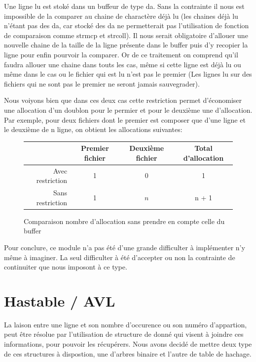 \documentclass[12pt]{article}
\begin{document}
    Une ligne lu est stoké dans un buffeur de type da. Sans la contrainte il
    nous est impossible de la comparer au chaine de charactère déjà lu 
    (les chaines déjà lu n'étant pas des da, car stocké des da ne 
    permetterait pas l'utilisation de fonction de comparaison comme strmcp 
    et strcoll). Il nous serait obligatoire d'allouer une nouvelle chaine 
    de la taille de la ligne présente dans le buffer puis d'y recopier la 
    ligne pour enfin pourvoir la comparer. Or de ce traitement on comprend 
    qu'il faudra allouer une chaine dans touts les cas, même si cette ligne
    est déjà lu ou même dans le cas ou le fichier qui est lu n'est pas le 
    premier (Les lignes lu sur des fichiers qui ne sont pas le premier ne 
    seront jamais sauvegrader). 
    
    Nous voiyons bien que dans ces deux cas cette restriction permet 
    d'économiser une allocation d'un doublon pour le permier et pour le 
    deuxième une d'allocation. Par exemple, pour deux fichiers dont le 
    premier est composer que d'une ligne et le deuxième de n ligne, on 
    obtient les allocations suivantes:\\
    \begin{figure}[ht]
        \centering
        \begin{tabular}{|r|c|c|c|}
            \hline{}
                \cellcolor{gray!25}     & Premier fichier & Deuxième fichier & 
                Total d'allocation \\
            \hline{}
            Avec restriction  & 1 & 0 & 1 \\
            \hline{}
            Sans restriction & 1 & $n$ & n + 1\\
            \hline
        \end{tabular}
        \caption{Comparaison nombre d'allocation sans prendre en compte 
        celle du buffer}\label{tab-compar-da}
    \end{figure}

    Pour conclure, ce module n'a pas été d'une grande difficulter à 
    implémenter n'y même à imaginer. La seul difficulter à été  
    d'accepter ou non la contrainte de continuiter que nous imposont à ce type.

    \section{Hastable / AVL}

    La laison entre une ligne et son nombre d'occurence ou son numéro 
    d'appartion, peut être résolue par l'utilisation de structure de donné qui 
    visent à joindre ces informations, pour pouvoir les récupérers. Nous avons 
    decidé de mettre deux type de ces structures à dispostion, une d'arbres 
    binaire et l'autre de table de hachage. 
\end{document}
